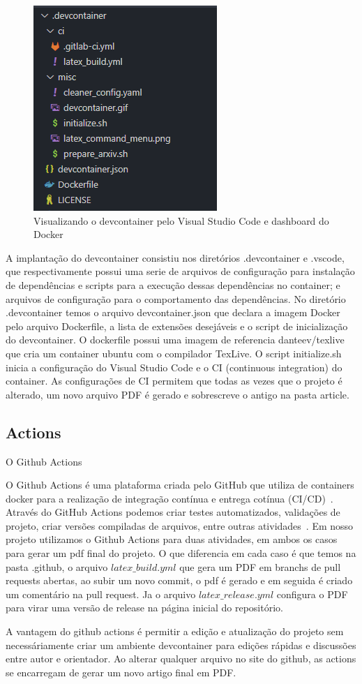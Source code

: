 \begin{figure}[ht]
	\centering
	\includegraphics[width=.5\textwidth]{./images/image12.png}
	\caption{Visualizando o devcontainer pelo Visual Studio Code e dashboard do Docker}
	\label{fig:image12}
\end{figure}
A implantação do devcontainer consistiu nos diretórios .devcontainer e .vscode, que respectivamente possui uma serie de arquivos de configuração para instalação de dependências e scripts para a execução dessas dependências no container; e arquivos de configuração para o comportamento das dependências.
No diretório .devcontainer temos o arquivo devcontainer.json que declara a imagem Docker pelo arquivo Dockerfile, a lista de extensões desejáveis e o script de inicialização do devcontainer. O dockerfile possui uma imagem de referencia  danteev/texlive que cria um container ubuntu com o compilador TexLive. O script initialize.sh inicia a configuração do Visual Studio Code e o CI (continuous integration) do container. As configurações de CI permitem que todas as vezes que o projeto é alterado, um novo arquivo PDF é gerado e sobrescreve o antigo na pasta article.

\subsection{Actions}
O Github Actions 

O Github Actions é uma plataforma criada pelo GitHub que utiliza de containers docker para a realização de integração contínua e entrega cotínua (CI/CD)~\cite{github:02}. Através do GitHub Actions podemos criar testes automatizados, validações de projeto, criar versões compiladas de arquivos, entre outras atividades~\cite{github:02}. Em nosso projeto utilizamos o Github Actions para duas atividades, em ambos os casos para gerar um pdf final do projeto. O que diferencia em cada caso é que temos na pasta .github, o arquivo $latex\_build.yml$ que gera um PDF em branchs de pull requests abertas, ao subir um novo commit, o pdf é gerado e em seguida é criado um comentário na pull request. Ja o arquivo $latex\_release.yml$ configura o PDF para virar uma versão de release na página inicial do repositório.

A vantagem do github actions é permitir a edição e atualização do projeto sem necessáriamente criar um ambiente devcontainer para edições rápidas e discussões entre autor e orientador. Ao alterar qualquer arquivo no site do github, as actions se encarregam de gerar um novo artigo final em PDF.